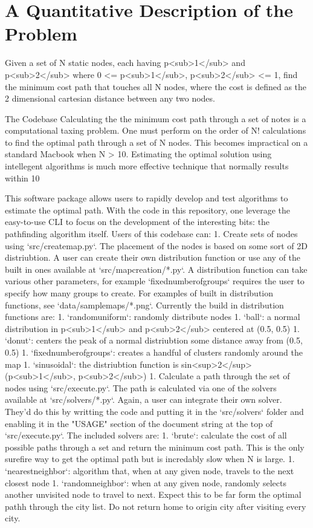 \documentclass[12pt]{article}
\begin{document}
\section{A Quantitative Description of the Problem}
Given a set of N static nodes, each having p<sub>1</sub> and p<sub>2</sub> where 0 <= p<sub>1</sub>, p<sub>2</sub> <= 1, find the minimum cost path that touches all N nodes, where the cost is defined as the 2 dimensional cartesian distance between any two nodes.


The Codebase
Calculating the the minimum cost path through a set of notes is a computational taxing problem.  One must perform on the order of N! calculations to find the optimal path through a set of N nodes.  This becomes impractical on a standard Macbook when N > 10.  Estimating the optimal solution using intellegent algorithms is much more effective technique that normally results within 10%

This software package allows users to rapidly develop and test algorithms to estimate the optimal path.  With the code in this repository, one leverage the easy-to-use CLI to focus on the development of the interesting bits: the pathfinding algorithm itself.  Users of this codebase can:
1.  Create sets of nodes using `src/createmap.py`.  The placement of the nodes is based on some sort of 2D distriubtion.  A user can create their own distribution function or use any of the built in ones available at `src/mapcreation/*.py`.  A distribution function can take various other parameters, for example `fixednumberofgroups` requires the user to specify how many groups to create.  For examples of built in distribution functions, see `data/samplemaps/*.png`.  Currently the build in distribution functions are:
    1.  `randomuniform`: randomly distribute nodes
    1.  `ball`: a normal distribution in p<sub>1</sub> and p<sub>2</sub> centered at (0.5, 0.5)
    1.  `donut`: centers the peak of a normal distriubtion some distance away from (0.5, 0.5)
    1.  `fixednumberofgroups`: creates a handful of clusters randomly around the map
    1.  `sinusoidal`: the distriubtion function is sin<sup>2</sup>(p<sub>1</sub>, p<sub>2</sub>)
1.  Calculate a path through the set of nodes using `src/execute.py`.  The path is calculated via one of the solvers available at `src/solvers/*.py`.  Again, a user can integrate their own solver.  They'd do this by writting the code and putting it in the `src/solvers` folder and enabling it in the "USAGE" section of the document string at the top of `src/execute.py`.  The included solvers are:
    1.  `brute`: calculate the cost of all possible paths through a set and return the minimum cost path.  This is the only surefire way to get the optimal path but is incredably slow when N is large.
    1.  `nearestneighbor`: algorithm that, when at any given node, travels to the next closest node
    1.  `randomneighbor`: when at any given node, randomly selects another unvisited node to travel to next.  Expect this to be far form the optimal pathh through the city list. Do not return home to origin city after visiting every city.
\end{document}
